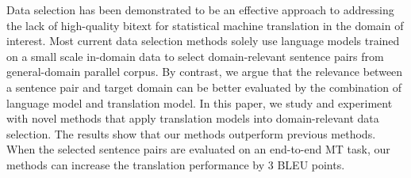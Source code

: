 Data selection has been demonstrated to be an effective approach to addressing the lack of high-quality bitext for statistical machine translation in the domain of interest. Most current data selection methods solely use language models trained on a small scale in-domain data to select domain-relevant sentence pairs from general-domain parallel corpus. By contrast, we argue that the relevance between a sentence pair and target domain can be better evaluated by the combination of language model and translation model. In this paper, we study and experiment with novel methods that apply translation models into domain-relevant data selection. The results show that our methods outperform previous methods. When the selected sentence pairs are evaluated on an end-to-end MT task, our methods can increase the translation performance by 3 BLEU points.
